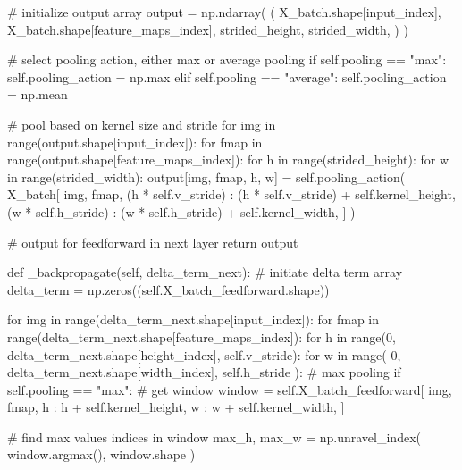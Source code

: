 \documentclass[%
oneside,                 %
final,                   %
10pt]{article}
\begin{document}
        # initialize output array
        output = np.ndarray(
            (
                X_batch.shape[input_index],
                X_batch.shape[feature_maps_index],
                strided_height,
                strided_width,
            )
        )

        # select pooling action, either max or average pooling
        if self.pooling == "max":
            self.pooling_action = np.max
        elif self.pooling == "average":
            self.pooling_action = np.mean

        # pool based on kernel size and stride
        for img in range(output.shape[input_index]):
            for fmap in range(output.shape[feature_maps_index]):
                for h in range(strided_height):
                    for w in range(strided_width):
                        output[img, fmap, h, w] = self.pooling_action(
                            X_batch[
                                img,
                                fmap,
                                (h * self.v_stride) : (h * self.v_stride)
                                + self.kernel_height,
                                (w * self.h_stride) : (w * self.h_stride)
                                + self.kernel_width,
                            ]
                        )

        # output for feedforward in next layer
        return output

    def _backpropagate(self, delta_term_next):
        # initiate delta term array
        delta_term = np.zeros((self.X_batch_feedforward.shape))

        for img in range(delta_term_next.shape[input_index]):
            for fmap in range(delta_term_next.shape[feature_maps_index]):
                for h in range(0, delta_term_next.shape[height_index], self.v_stride):
                    for w in range(
                        0, delta_term_next.shape[width_index], self.h_stride
                    ):
                        # max pooling
                        if self.pooling == "max":
                            # get window
                            window = self.X_batch_feedforward[
                                img,
                                fmap,
                                h : h + self.kernel_height,
                                w : w + self.kernel_width,
                            ]

                            # find max values indices in window
                            max_h, max_w = np.unravel_index(
                                window.argmax(), window.shape
                            )
\end{document}
